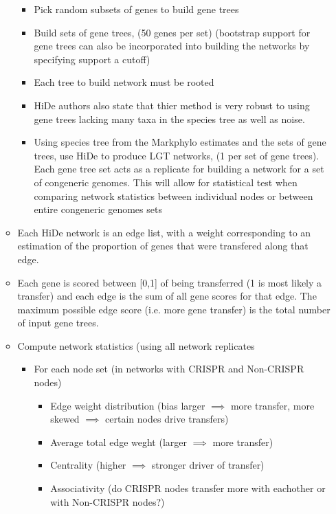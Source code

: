 \documentclass[12pt,letter]{article}
\begin{document}
\begin{itemize}
\begin{itemize}
        \begin{itemize}
            \item Pick random subsets of genes to build gene trees
            \item Build sets of gene trees, (50 genes per set) (bootstrap support for gene trees can also be incorporated into building the networks by specifying support a cutoff)
            \item Each tree to build network must be rooted
            \item HiDe authors also  state that thier method is very robust to using gene trees lacking many taxa in the species tree as well as noise.
            \item Using species tree from the Markphylo estimates and the sets of gene trees, use HiDe to produce LGT networks, (1 per set of gene trees). Each gene tree set acts as a replicate for building a network for a set of congeneric genomes. This will allow for statistical test when comparing network statistics between individual nodes or between entire congeneric genomes sets
        \end{itemize}
        \item Each HiDe network is an edge list, with a weight corresponding to an estimation of the proportion of genes that were transfered along that edge.
        \item Each gene is scored between [0,1] of being transferred (1 is most likely a transfer) and each edge is the sum of all gene scores for that edge. The maximum possible edge score (i.e. more gene  transfer) is the total number of input gene trees.
        \item Compute network statistics (using all network replicates
        \begin{itemize}
            \item For each node set (in networks with CRISPR and Non-CRISPR nodes)
            \begin{itemize}
                \item Edge weight distribution (bias larger $\implies$ more transfer, more skewed $\implies$ certain nodes drive transfers)
                \item Average total edge weght (larger $\implies$ more transfer)
                \item Centrality (higher $\implies$ stronger driver of transfer)
                \item Associativity (do CRISPR nodes transfer more with eachother or with Non-CRISPR nodes?)

\end{itemize}
\end{itemize}
\end{itemize}
\end{itemize}
\end{document}
